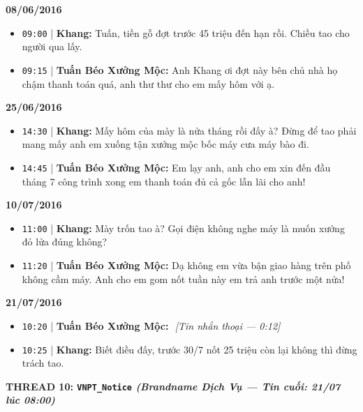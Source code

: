 \documentclass[12pt,a4paper]{article}
\begin{document}
\textbf{08/06/2016}

\begin{itemize}[leftmargin=*, itemsep=2pt, topsep=2pt, parsep=0pt]
  \item \texttt{09:00} | \textbf{Khang:} Tuấn, tiền gỗ đợt trước 45 triệu đến hạn rồi. Chiều tao cho người qua lấy.
  \item \texttt{09:15} | \textbf{Tuấn Béo Xưởng Mộc:} Anh Khang ơi đợt này bên chủ nhà họ chậm thanh toán quá, anh thư thư cho em mấy hôm với ạ.

\end{itemize}
\textbf{25/06/2016}

\begin{itemize}[leftmargin=*, itemsep=2pt, topsep=2pt, parsep=0pt]
  \item \texttt{14:30} | \textbf{Khang:} Mấy hôm của mày là nửa tháng rồi đấy à? Đừng để tao phải mang mấy anh em xuống tận xưởng mộc bốc máy cưa máy bào đi.
  \item \texttt{14:45} | \textbf{Tuấn Béo Xưởng Mộc:} Em lạy anh, anh cho em xin đến đầu tháng 7 công trình xong em thanh toán đủ cả gốc lẫn lãi cho anh!

\end{itemize}
\textbf{10/07/2016}

\begin{itemize}[leftmargin=*, itemsep=2pt, topsep=2pt, parsep=0pt]
  \item \texttt{11:00} | \textbf{Khang:} Mày trốn tao à? Gọi điện không nghe máy là muốn xưởng đỏ lửa đúng không?
  \item \texttt{11:20} | \textbf{Tuấn Béo Xưởng Mộc:} Dạ không em vừa bận giao hàng trên phố không cầm máy. Anh cho em gom nốt tuần này em trả anh trước một nửa!

\end{itemize}
\textbf{21/07/2016}

\begin{itemize}[leftmargin=*, itemsep=2pt, topsep=2pt, parsep=0pt]
  \item \texttt{10:20} | \textbf{Tuấn Béo Xưởng Mộc:} ️ \textit{[Tin nhắn thoại — 0:12]}
  \item \texttt{10:25} | \textbf{Khang:} Biết điều đấy, trước 30/7 nốt 25 triệu còn lại không thì đừng trách tao.


\end{itemize}

\vspace{0.3cm}\noindent\textbf{\large  THREAD 10: \texttt{VNPT\_Notice} \textit{(Brandname Dịch Vụ — Tin cuối: 21/07 lúc 08:00)}}\\[0.15cm]
\end{document}
